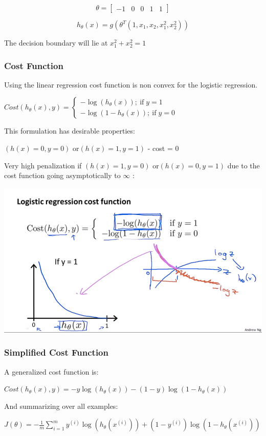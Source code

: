 $$\theta = \left[ \begin{matrix} -1 & 0 & 0  & 1 & 1 \end{matrix} \right]$$

$$h_\theta(x) = g(\theta^T(1,x_1,x_2,x_1^2,x_2^2 )) $$

The decision boundary will lie at $x_1^2 + x_2^2 = 1$

\subsubsection{Cost Function}

Using the linear regression cost function is non convex for the logistic regression.

$Cost(h_\theta(x),y) = \begin{cases} -\log(h_\theta(x))  ;\ \text{if} \;  y=1 \\ -\log(1-h_\theta(x))   ;\ \text{if} \;  y=0  \end{cases}$

This formulation has desirable properties: 

$(h(x)=0, y = 0)$ or$(h(x) = 1, y = 1)$  - cost = 0

Very high penalization if $(h(x)=1, y = 0)$ or$(h(x) = 0, y = 1)$ due to the cost function going asymptotically to $\infty$ :

\includegraphics[width=0.8\columnwidth]{ml_figures/cost_function.png}

\subsubsection{Simplified Cost Function}

A generalized cost function is: 

$Cost(h_\theta (x), y) =-y\log(h_\theta(x))-(1-y)\log(1-h_\theta(x))  $

And summarizing over all examples:

$J(\theta)= -\frac{1}{m} \sum_{i=1}^{m} y^{(i)}\log(h_\theta(x^{(i)}))+(1-y^{(i)})\log(1-h_\theta(x^{(i)}))$

